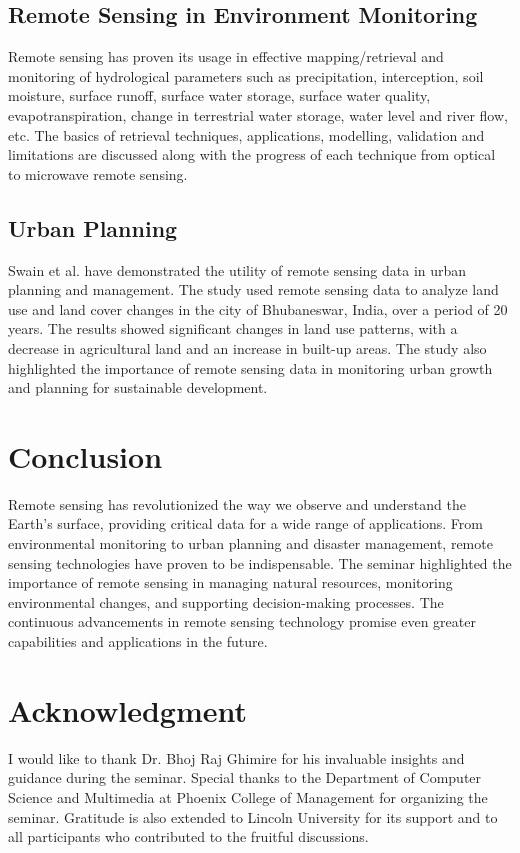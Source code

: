 \documentclass[conference]{IEEEtran}
\begin{document}
\subsection{Remote Sensing in Environment Monitoring}
Remote sensing has proven its usage in effective mapping/retrieval and monitoring of hydrological parameters such as precipitation, interception, soil moisture, surface runoff, surface water storage, surface water quality, evapotranspiration, change in terrestrial water storage, water level and river flow, etc. The basics of retrieval techniques, applications, modelling, validation and limitations are discussed along with the progress of each technique from optical to microwave remote sensing. \cite{Thakur2024}

\subsection{Urban Planning}
Swain et al. have demonstrated the utility of remote sensing data in urban planning and management. The study used remote sensing data to analyze land use and land cover changes in the city of Bhubaneswar, India, over a period of 20 years. The results showed significant changes in land use patterns, with a decrease in agricultural land and an increase in built-up areas. The study also highlighted the importance of remote sensing data in monitoring urban growth and planning for sustainable development. \cite{Swain2024}

\section{Conclusion}
Remote sensing has revolutionized the way we observe and understand the Earth's surface, providing critical data for a wide range of applications. From environmental monitoring to urban planning and disaster management, remote sensing technologies have proven to be indispensable. The seminar highlighted the importance of remote sensing in managing natural resources, monitoring environmental changes, and supporting decision-making processes. The continuous advancements in remote sensing technology promise even greater capabilities and applications in the future.

\section*{Acknowledgment}
I would like to thank Dr. Bhoj Raj Ghimire for his invaluable insights and guidance during the seminar. Special thanks to the Department of Computer Science and Multimedia at Phoenix College of Management for organizing the seminar. Gratitude is also extended to Lincoln University for its support and to all participants who contributed to the fruitful discussions.



\end{document}
